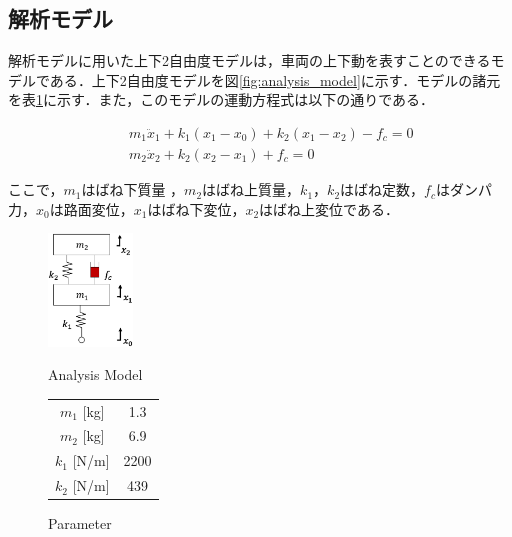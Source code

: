 \documentclass{article_vdlab_sotsuron_youshi}
\begin{document}
\subsection{解析モデル}
解析モデルに用いた上下2自由度モデルは，車両の上下動を表すことのできるモデルである\cite{2dof}．上下2自由度モデルを図\ref{fig:analysis_model}に示す．モデルの諸元を表\ref{tab:parameter}に示す．また，このモデルの運動方程式は以下の通りである．

\noindent
\begin{eqnarray}
 \label{eq:2dof_m1} &&m_1\ddot x_1 + k_1(x_1-x_0) + k_2(x_1-x_2) - f_c = 0\\
 \label{eq:2dof_m2} &&m_2\ddot x_2 + k_2(x_2-x_1) + f_c = 0
\end{eqnarray}

ここで，$m_1$はばね下質量 ，$m_2$はばね上質量，$k_1$，$k_2$はばね定数，$f_c$はダンパ力，$x_0$は路面変位，$x_1$はばね下変位，$x_2$はばね上変位である．

\begin{figure}[H]
  \begin{minipage}{0.5\hsize}
    \begin{center}
      \includegraphics[height=30mm]{figure/analysis_model.eps}
      \vspace*{1mm}
      \caption{Analysis Model}
    \label{fig:analysis_model}
    \end{center}
  \end{minipage}
  \begin{minipage}{0.35\hsize}
      \begin{center}
	\makeatletter
	\def\@captype{table}
	\makeatother
	\caption{Parameter}
	\label{tab:parameter}
	  \begin{tabular}{cc}\hline
	    $m_1$ [kg] & 1.3\\
	    $m_2$ [kg] & 6.9\\
	    $k_1$ [N/m] & 2200\\
	    $k_2$ [N/m] & 439\\\hline
	  \end{tabular}
      \end{center}
  \end{minipage}
\end{figure}
\end{document}
